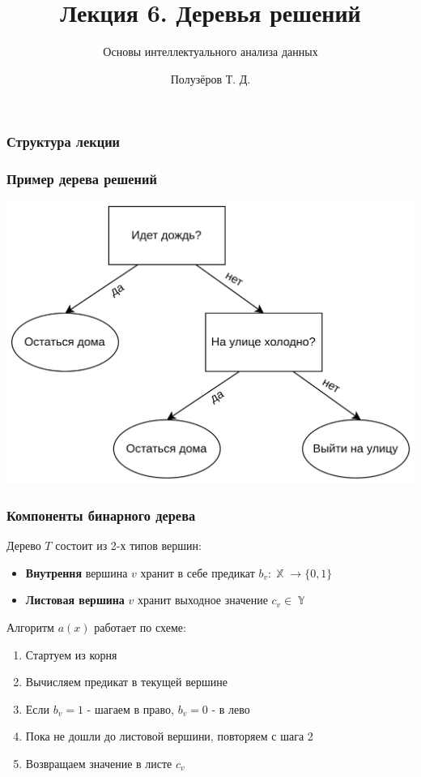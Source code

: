 \documentclass{beamer}
\title[Деревья решений]{Лекция 6. Деревья решений}
\subtitle{Основы интеллектуального анализа данных}
\author{Полузёров Т. Д.}
\institute{БГУ ФПМИ}
\date{}
\DeclareMathOperator{\X}{\mathbb{X}}
\DeclareMathOperator{\Y}{\mathbb{Y}}
\begin{document}
	
	\begin{frame}
		\titlepage
	\end{frame}
	
	
	\begin{center}
		\frametitle{Структура лекции}
	\end{center}
    
	\begin{frame}
		\frametitle{Пример дерева решений}
		\includegraphics[width=1\textwidth]{dc}
	\end{frame}

    \begin{frame}
        \frametitle{Компоненты бинарного дерева}

		Дерево $T$ состоит из 2-х типов вершин:
		\begin{itemize}
			\item \textbf{Внутрення} вершина $v$ хранит в себе предикат $b_v: \X \rightarrow \{0, 1\}$
			\item \textbf{Листовая вершина} $v$ хранит выходное значение $c_v \in \Y$
		\end{itemize}

		\vspace{15pt}

		Алгоритм $a(x)$ работает по схеме:
		\begin{enumerate}
			\item Стартуем из корня
			\item Вычисляем предикат в текущей вершине
			\item Если $b_v = 1$ - шагаем в право, $b_v = 0$ - в лево
			\item Пока не дошли до листовой вершини, повторяем с шага 2
			\item Возвращаем значение в листе $c_v$
		\end{enumerate}
    \end{frame}
\end{document}

